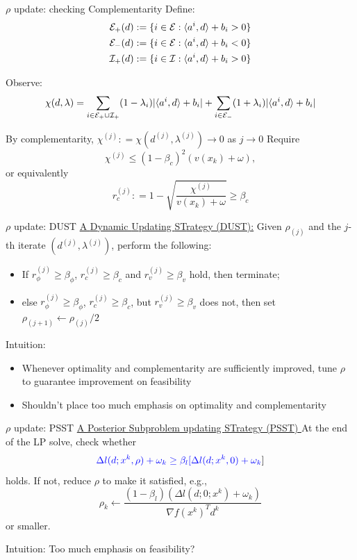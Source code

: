 \documentclass[8pt]{beamer}
\begin{document}
	\begin{frame}{$\rho$ update: checking Complementarity}
		Define: 
		\[ \begin{aligned}
		{\cal E}_+(d) & := \{  i\in {\cal E}:  \langle a^i, d\rangle + b_i > 0\}\\
		{\cal E}_-(d) & := \{ i\in{\cal E}:  \langle a^i, d\rangle + b_i < 0\} \\
		{\cal I}_+(d) & := \{i \in{\cal I}: \langle a^i, d\rangle + b_i > 0\}
		\end{aligned}
		\]

		Observe: 
		\[ \chi(d,\lambda) = \sum_{i\in {\cal E}_+\cup {\cal I}_+} (1-\lambda_i) |\langle a^i, d\rangle + b_i| + \sum_{i\in{\cal E}_-} (1+\lambda_i) |\langle a^i, d\rangle + b_i|  \]

		By complementarity,    {\blue $\chi^{(j)}: =  \chi(d^{(j)},\lambda^{(j)}) \to 0$  as $j\to 0$ }
		\vfill
		Require \[ \chi^{(j)} \le (1-\beta_c)^2 (v(x_k)+\omega), \] or equivalently
		{\red \[ r_c^{(j)}: =1- \sqrt{  \frac{ \chi^{(j)} }{v(x_k)+\omega} } \ge \beta_c \]}
	\end{frame}


	\begin{frame}{$\rho$ update:  DUST} 
		\underline{ A {\blue D}ynamic {\blue U}pdating {\blue ST}rategy (DUST):} 
		\vfill 
		Given $\rho_{(j)}$ and the $j$-th iterate $(d^{(j)}, \lambda^{(j)})$, perform the following:
		\begin{itemize}
			\item  If $r_{\phi}^{(j)} \ge \beta_\phi$, $r_c^{(j)} \ge \beta_c$ and $r_v^{(j)} \ge \beta_v$ hold, then terminate; 
			\item  else $r_{\phi}^{(j)} \ge \beta_\phi$, $r_c^{(j)} \ge \beta_c$, but $r_v^{(j)} \ge \beta_v$ does not, then set $\rho_{(j+1)} \gets \rho_{(j)}/2$
		\end{itemize}
		\vfill
		{\blue \leftpointright Intuition:}  
		\begin{itemize}
			\item Whenever optimality and complementarity are sufficiently improved,  tune  $\rho$ to guarantee improvement on feasibility 
			\item Shouldn't place too much emphasis on optimality and complementarity
		\end{itemize}
	\end{frame}

	\begin{frame}{$\rho$ update:  PSST} 
		\underline{ A {\blue P}osterior {\blue S}ubproblem updating {\blue ST}rategy (PSST) }
		\vfill
		At the end of the LP solve, check whether 
		$${\color{blue}   \Delta l(d; x^k,\rho)  + \omega_k  \ge  \beta_l [\Delta l(d; x^k, 0) + \omega_k}] $$
		holds.  If not, reduce $\rho$ to make it satisfied, e.g., 
		\[ \rho_k \gets \frac{(1-\beta_l)( \Delta l(d; 0;x^k)+\omega_k) }{ \nabla f(x^k)^Td^k  } \]
			or smaller. 

		\vfill
		{\blue 	\leftpointright Intuition:}  Too much emphasis on feasibility?
	\end{frame}
\end{document}

